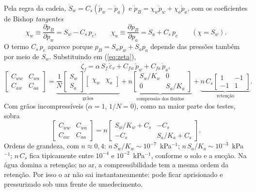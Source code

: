 \documentclass[11pt,a4paper]{article}
\begin{document}
Pela regra da cadeia, $\dot S_w=C_s(\dot p_w-\dot p_a)$ e
$\dot p_B=\chi_w\dot p_w+\chi_a\dot p_a$, com os coeficientes de Bishop \emph{tangentes}
\begin{equation}
\chi_w\equiv\frac{\partial p_B}{\partial p_w}=S_w-C_s\,p_c,\qquad
\chi_a\equiv\frac{\partial p_B}{\partial p_a}=S_a+C_s\,p_c\qquad(\chi=S_w).
\label{eq:chitan}
\end{equation}
O termo $C_s\,p_c$ aparece porque $p_B=S_wp_w+S_ap_a$ depende das pressões também por
meio de $S_w$. Substituindo em (\ref{eq:zeta}),
\begin{equation}
\dot\zeta_f=\alpha\,S_f\,\dot\varepsilon_v+C_{fw}\,\dot p_w+C_{fa}\,\dot p_a ,
\label{eq:zeta2}
\end{equation}
\begin{equation}
\begin{bmatrix}C_{ww}&C_{wa}\\C_{aw}&C_{aa}\end{bmatrix}
=\underbrace{\frac1N\begin{bmatrix}S_w\\S_a\end{bmatrix}\!\begin{bmatrix}\chi_w&\chi_a\end{bmatrix}}_{\text{grãos}}
+\underbrace{n\begin{bmatrix}S_w/K_w&0\\0&S_a/K_a\end{bmatrix}}_{\text{compressão dos fluidos}}
+\underbrace{n\,C_s\begin{bmatrix}1&-1\\-1&1\end{bmatrix}}_{\text{retenção}} .
\label{eq:Cmat}
\end{equation}
Com grãos incompressíveis ($\alpha=1$, $1/N=0$), como na maior parte dos testes, sobra
\begin{equation}
\begin{bmatrix}C_{ww}&C_{wa}\\C_{aw}&C_{aa}\end{bmatrix}
=n\begin{bmatrix}S_w/K_w+C_s&-C_s\\-C_s&S_a/K_a+C_s\end{bmatrix}.
\label{eq:Cmat0}
\end{equation}
Ordens de grandeza, com $n\approx0{,}4$: $n\,S_w/K_w\sim10^{-7}$~kPa$^{-1}$;
$n\,S_a/K_a\sim10^{-3}$~kPa$^{-1}$; $n\,C_s$ fica tipicamente entre $10^{-4}$ e
$10^{-2}$~kPa$^{-1}$, conforme o solo e a sucção. Na água domina a retenção; no ar, a
compressibilidade tem a mesma ordem da retenção. Por isso o ar não sai
instantaneamente: pode ficar aprisionado e pressurizado sob uma frente de umedecimento.
\end{document}
